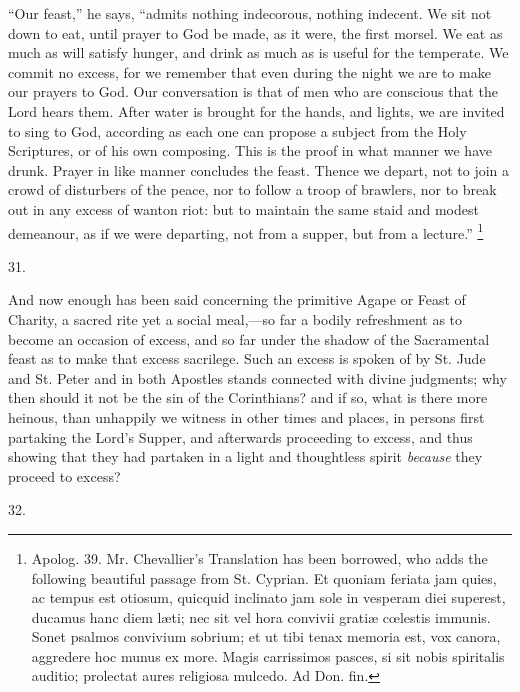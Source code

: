 ``Our feast,'' he says, ``admits nothing indecorous,
nothing indecent. We sit not down to eat, until prayer to God be made,
as it were, the first morsel. We eat as much as will satisfy hunger,
and drink as much as is useful for the temperate. We commit no excess,
for we remember that even during the night we are to make our prayers
to God. Our conversation is that of men who are conscious that the
Lord hears them. After water is brought for the hands, and lights, we
are invited to sing to God, according as each one can propose a
subject from the Holy Scriptures, or of his own composing. This is the
proof in what manner we have drunk. Prayer in like manner concludes
the feast. Thence we depart, not to join a crowd of disturbers of the
peace, nor to follow a troop of brawlers, nor to break out in any
excess of wanton riot: but to maintain the same staid and modest
demeanour, as if we were departing, not from a supper, but from a
lecture.'' \footnote{Apolog. 39. Mr. Chevallier's Translation has been borrowed, who adds
the following beautiful passage from St. Cyprian. Et quoniam feriata
jam quies, ac tempus est otiosum, quicquid inclinato jam sole in
vesperam diei superest, ducamus hanc diem læti; nec sit vel hora
convivii gratiæ cœlestis immunis. Sonet psalmos convivium sobrium;
et ut tibi tenax memoria est, vox canora, aggredere hoc munus ex more.
Magis carrissimos pasces, si sit nobis spiritalis auditio; prolectat
aures religiosa mulcedo. Ad Don. fin.}

31.

And now enough has been said concerning the
primitive Agape or Feast of Charity, a sacred rite yet a social
meal,—so far a bodily refreshment as to become an occasion of
excess, and so far under the shadow of the Sacramental feast as to
make that excess sacrilege. Such an excess is spoken of by St. Jude
and St. Peter and in both Apostles stands connected with divine
judgments; why then should it not be the sin of the Corinthians? and
if so, what is there more heinous, than unhappily we witness in
other times and places, in persons first partaking the Lord's Supper,
and afterwards proceeding to excess, and thus showing that they had
partaken in a light and thoughtless spirit \emph{because} they proceed to
excess?

32.

